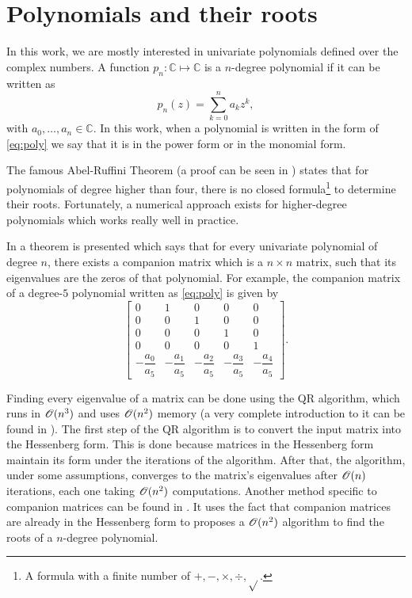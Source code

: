 \section{Polynomials and their roots}

In this work, we are mostly interested in univariate polynomials defined over the complex numbers.
A function $p_n: \mathbb{C} \mapsto \mathbb{C}$ is a $n$-degree polynomial if it can be written as
\begin{equation}\label{eq:poly}
p_n(z) = \sum_{k=0}^{n} a_k z^k,
\end{equation}
with $a_0, \dots, a_n \in \mathbb{C}$. In this work, when a polynomial is written in the form of \autoref{eq:poly} we say that it is in the power form or in the monomial form.

The famous Abel-Ruffini Theorem (a proof can be seen in ) states that for polynomials of degree higher than four, there is no closed formula\footnote{A formula with a finite number of $+, -, \times, \div, \sqrt{}$.} to determine their roots. Fortunately, a numerical approach exists for higher-degree polynomials which works really well in practice.

 In  a theorem is presented which says that for every univariate polynomial of degree $n$, there exists a companion matrix which is a $n\times n$ matrix, such that its eigenvalues are the zeros of that polynomial. For example, the companion matrix of a degree-$5$ polynomial written as \autoref{eq:poly} is given by
 \begin{equation*}
 \left[\begin{array}{ccccc}
 0 & 1 & 0 & 0 & 0\\
 0 & 0 & 1 & 0 & 0\\
 0 & 0 & 0 & 1 & 0\\
 0 & 0 & 0 & 0 & 1\\
 -\dfrac{a_0}{a_5} & -\dfrac{a_1}{a_5} & -\dfrac{a_2}{a_5} & -\dfrac{a_3}{a_5} & -\dfrac{a_4}{a_5}
 \end{array}\right].
 \end{equation*}


Finding every eigenvalue of a matrix can be done using the QR algorithm, which runs in $\mathscr{O}(n^3)$ and uses $\mathscr{O}(n^2)$ memory (a very complete introduction to it can be found in ). 
The first step of the QR algorithm is to convert the input matrix into the Hessenberg form. This is done because matrices in the Hessenberg form maintain its form under the iterations of the algorithm. After that, the algorithm, under some assumptions, converges to the matrix's eigenvalues after $\mathscr{O}(n)$ iterations, each one taking $\mathscr{O}(n^2)$ computations.
Another method specific to companion matrices can be found in . It uses the fact that companion matrices are already in the Hessenberg form to proposes a $\mathscr{O}(n^2)$ algorithm to find the roots of a $n$-degree polynomial.
 
